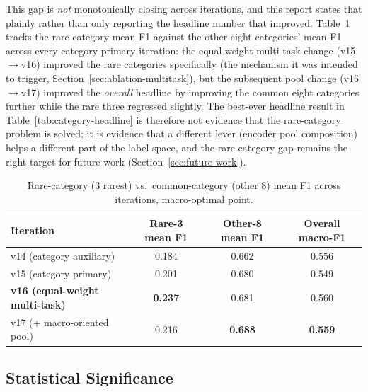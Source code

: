 This gap is \emph{not} monotonically closing across iterations, and this
report states that plainly rather than only reporting the headline number
that improved. Table~\ref{tab:rare-trajectory} tracks the rare-category mean
F1 against the other eight categories' mean F1 across every category-primary
iteration: the equal-weight multi-task change (v15$\to$v16) improved the
rare categories specifically (the mechanism it was intended to trigger,
Section~\ref{sec:ablation-multitask}), but the subsequent pool change
(v16$\to$v17) improved the \emph{overall} headline by improving the common
eight categories further while the rare three regressed slightly. The
best-ever headline result in Table~\ref{tab:category-headline} is therefore
not evidence that the rare-category problem is solved; it is evidence that a
different lever (encoder pool composition) helps a different part of the
label space, and the rare-category gap remains the right target for future
work (Section~\ref{sec:future-work}).

\begin{table}[H]
\centering
\caption{Rare-category (3 rarest) vs.\ common-category (other 8) mean F1 across iterations,
macro-optimal point.}
\label{tab:rare-trajectory}
\begin{tabular}{@{}lccc@{}}
\toprule
\textbf{Iteration} & \textbf{Rare-3 mean F1} & \textbf{Other-8 mean F1} & \textbf{Overall macro-F1} \\
\midrule
v14 (category auxiliary) & 0.184 & 0.662 & 0.556 \\
v15 (category primary) & 0.201 & 0.680 & 0.549 \\
\textbf{v16 (equal-weight multi-task)} & \textbf{0.237} & 0.681 & 0.560 \\
v17 (+ macro-oriented pool) & 0.216 & \textbf{0.688} & \textbf{0.559} \\
\bottomrule
\end{tabular}
\end{table}

\subsection{Statistical Significance}

